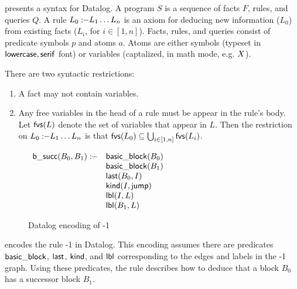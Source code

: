 \documentclass{article}
\begin{document}
 presents a syntax for Datalog.
A program $S$ is a sequence of facts $F$, rules, and queries $Q$.
A rule $L_0 :\!\!- L_1 \ldots L_n$ is an axiom for deducing new information ($L_0$) from existing facts ($L_i$, for $i \in [1,n]$).
Facts, rules, and queries consist of predicate symbols $p$ and atoms $a$.
Atoms are either symbols (typeset in $\mathsf{lowercase, serif}$ font) or variables (captalized, in math mode, e.g. $X$).

There are two syntactic restrictions:
\begin{enumerate}
\item A fact may not contain variables.
\item Any free variables in the head of a rule must be appear in the rule's body.
  Let $\mathsf{fvs}(L)$ denote the set of variables that appear in $L$.
  Then the restriction on $L_0 :\!\!- L_1 \ldots L_n$ is that $\mathsf{fvs}(L_0) \subseteq \bigcup_{i \in [1,n]} \mathsf{fvs}(L_i)$.
\end{enumerate}

\begin{figure}
  \begin{center}$\begin{array}{l l l}
  \mathsf{b\_succ}(B_0, B_1) :\!\!-
  & \mathsf{basic\_block}(B_0)
  &
  \\
  & \mathsf{basic\_block}(B_1)
  &
  \\
  & \mathsf{last}(B_0, I)
  &
  \\
  & \mathsf{kind}(I, \mathsf{jump})
  &
  \\
  & \mathsf{lbl}(I, L)
  &
  \\
  & \mathsf{lbl}(B_1, L)
  &
  \end{array}$\end{center}
  \caption{Datalog encoding of {\bb}-1}
  \label{fig:datalog-bb}
\end{figure}

 encodes the rule {\bb}-1 in Datalog.
This encoding assumes there are predicates $\mathsf{basic\_block}$, $\mathsf{last}$, $\mathsf{kind}$, and $\mathsf{lbl}$ corresponding to the edges and labels in the {\bb}-1 graph.
Using these predicates, the rule describes how to deduce that a block $B_0$ has a successor block $B_1$.
\end{document}
